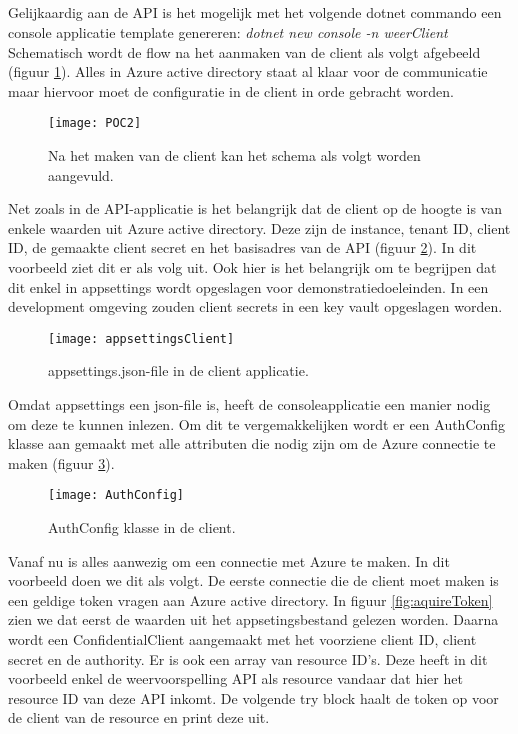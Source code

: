 \subsection{}
Gelijkaardig aan de API is het mogelijk met het volgende dotnet commando een console applicatie template genereren: \emph{dotnet new console -n weerClient}\newline
Schematisch wordt de flow na het aanmaken van de client als volgt afgebeeld (figuur \ref{fig:poc2}). Alles in Azure active directory staat al klaar voor de communicatie maar hiervoor moet de configuratie in de client in orde gebracht worden.
\begin{figure}[H]
	\centering
	\texttt{[image: POC2]} 
	\caption[POC2]{Na het maken van de client kan het schema als volgt worden aangevuld.}
	\label{fig:poc2}
\end{figure}
Net zoals in de API-applicatie is het belangrijk dat de client op de hoogte is van enkele waarden uit Azure active directory. Deze zijn de instance, tenant ID, client ID, de gemaakte client secret en het basisadres van de API (figuur \ref{fig:appsettingsClient}). In dit voorbeeld ziet dit er als volg uit. Ook hier is het belangrijk om te begrijpen dat dit enkel in appsettings wordt opgeslagen voor demonstratiedoeleinden. In een development omgeving zouden client secrets in een key vault opgeslagen worden.
\begin{figure}[H]
	\centering
	\texttt{[image: appsettingsClient]} 
	\caption[POC2]{appsettings.json-file in de client applicatie.}
	\label{fig:appsettingsClient}
\end{figure}
Omdat appsettings een json-file is, heeft de consoleapplicatie een manier nodig om deze te kunnen inlezen. Om dit te vergemakkelijken wordt er een AuthConfig klasse aan gemaakt met alle attributen die nodig zijn om de Azure connectie te maken (figuur \ref{fig:authConfig}).
\begin{figure}[H]
	\centering
	\texttt{[image: AuthConfig]} 
	\caption[AuthConfig]{AuthConfig klasse in de client.}
	\label{fig:authConfig}
\end{figure}\newpage
Vanaf nu is alles aanwezig om een connectie met Azure te maken. In dit voorbeeld doen we dit als volgt. De eerste connectie die de client moet maken is een geldige token vragen aan Azure active directory. In figuur \ref{fig:aquireToken} zien we dat eerst de waarden uit het appsetingsbestand gelezen worden. Daarna wordt een ConfidentialClient aangemaakt met het voorziene client ID, client secret en de authority. Er is ook een array van resource ID’s. Deze heeft in dit voorbeeld enkel de weervoorspelling API als resource vandaar dat hier het resource ID van deze API inkomt. De volgende try block haalt de token op voor de client van de resource en print deze uit.
